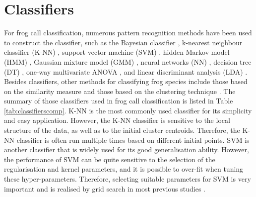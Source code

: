 \section{Classifiers}
\label{classifiers}
For frog call classification, numerous pattern recognition methods have been used to construct the classifier, such as the Bayesian classifier \citep{Brandes2006}, k-nearest neighbour classifier (K-NN) \citep{ huang2008realization,huang2009frog, han2011acoustic, dayou2011classification, jaafar2013, Gingras2013, jaafar2013mfcc,jaafarcomparative, yuan2012frog, vaca2010using, feature2012Colona}, support vector machine (SVM) \citep{huang2008realization,acevedo2009automated, huang2009frog, tanintelligent2014, Gingras2013,jaafarcomparative}, hidden Markov model (HMM) \citep{brandes2008feature}, Gaussian mixture model (GMM) \citep{huang2008realization, Gingras2013}, neural networks (NN) \citep{Huang20141, yen2002automatic}, decision tree (DT) \citep{grigg1996monitoring, acevedo2009automated}, one-way multivariate ANOVA \citep{camacho2013automatic}, and linear discriminant analysis (LDA) \citep{acevedo2009automated,lee2006automatic}.  Besides classifiers, other methods for classifying frog species include those based on the similarity measure \citep{croker2012using, dang2008lightweight, chen2012automatic} and those based on the clustering technique \citep{colombia2009frogs, wei2012distributed, bedoya2014automatic}. The summary of those classifiers used in frog call classification is listed in Table \ref{tab:classifierscomp}.
K-NN is the most commonly used classifier for its simplicity and easy application. However, the K-NN classifier is sensitive to the local structure of the data, as well as to the initial cluster centroids. Therefore, the K-NN classifier is often run multiple times based on different initial points. 
SVM is another classifier that is widely used for its good generalisation ability. However, the performance of SVM can be quite sensitive to the selection of the regularisation and kernel parameters, and it is possible to over-fit when tuning these hyper-parameters. Therefore, selecting suitable parameters for SVM is very important and is realised by grid search in most previous studies \citep{hsu2003practical}.

